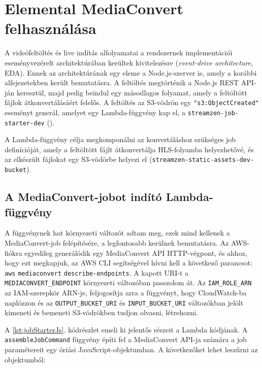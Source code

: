 \section{Elemental MediaConvert felhasználása}

A videófeltöltés és live indítás alfolyamatai a rendszernek implementációi eseményvezérelt architektúrában kerültek kivitelezésre (\emph{event-drive architecture}, EDA\cite{eda}). Ennek az architektúrának egy eleme a Node.js-szerver is, amely a korábbi alfejezetekben került bemutatásra. A feltöltés megtörténik a Node.js REST API-ján keresztül, majd pedig beindul egy másodlagos folyamat, amely a feltöltött fájlok átkonvertálásáért felelős. A feltöltés az S3-vödrön egy \verb|"s3:ObjectCreated"| eseményt generál, amelyet egy Lambda-függvény kap el, a \verb|streamzen-job-starter-dev| ().

A Lambda-függvény célja megkomponálni az konvertáláshoz szükséges job definícióját, amely a feltöltött fájlt átkonvertálja HLS-folyamba helyezhetővé, és az elkészült fájlokat egy S3-vödörbe helyezi el (\verb|streamzen-static-assets-dev-bucket|).

\subsection{A MediaConvert-jobot indító Lambda-függvény}

A függvénynek hat környezeti változót adtam meg, ezek mind kellenek a MediaConvert-job felépítésére, a legfontosabb kerülnek bemutatásra. Az AWS-fiókra egyedileg generálódik egy MediaConvert API HTTP-végpont, és ahhoz, hogy ezt megkapjuk, az AWS CLI segítségével hívni kell a következő parancsot: \verb|aws| \verb|mediaconvert| \verb|describe-endpoints|. A kapott URI-t a \verb|MEDIACONVERT_ENDPOINT| környezeti változóban passzolom át. Az \verb|IAM_ROLE_ARN| az IAM-szerepkör ARN-je, feljogosítja arra a függvényt, hogy CloudWatch-ba naplózzon és az \verb|OUTPUT_BUCKET_URI| és \verb|INPUT_BUCKET_URI| változókban jelölt kimeneti és bemeneti S3-vödrökben tudjon olvasni, létrehozni.

A \ref{lst:jobStarterJs}. kódrészlet emeli ki jelentős részeit a Lambda kódjának. A \verb|assembleJobCommand| függvény építi fel a MediaConvert API-ja számára a job paramétereit egy óriási JavaScript-objektumban. A következőket lehet leszűrni az objektumból:


